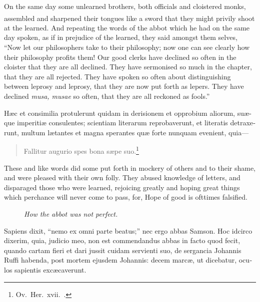 \documentclass[10pt]{book}
\newcounter{engnote}
\newcommand{\engnotenum}{\textsuperscript{\arabic{engnote}\stepcounter{engnote}}}
\newcommand{\blockhead}[4][]{
\begin{figure}
\centering
\vspace{#4}
\parbox{2.75cm}{\begin{center}\footnotesize \color{BrickRed} \emph{#2}\\ #1 \end{center}}
\end{figure}
}
\begin{document}
\begin{paracol}{2}
\switchcolumn

On the same day some unlearned brothers, both officials and cloistered monks, assembled and sharpened their tongues\engnotenum{} like a sword that they might privily shoot at the learned. And repeating the words of the abbot which he had on the same day spoken, as if in prejudice of the learned, they said amongst them selves, ``Now let our philosophers take to their philosophy; now one can see clearly how their philosophy profits them! Our good clerks have declined so often in the cloister that they are all declined. They have sermonised so much in the chapter, that they are all rejected. They have spoken so often about distinguishing between leprosy and leprosy, that they are now put forth as lepers. They have declined \emph{musa, musae} so often, that they are all reckoned as fools.''

\switchcolumn*

\begin{otherlanguage}{latin}
H\ae{}c et consimilia protulerunt quidam in derisionem et opprobium aliorum, su\ae{}que imperiti\ae{} consulentes; scientiam literarum reprobaverunt, et literatis detraxerunt, multum l\ae{}tantes et magna sperantes qu\ae{} forte nunquam evenient, quia---
\begin{verse}
Fallitur augurio spes bona s\ae{}pe suo.\footnote[\textdagger]{Ov.\ Her.\ xvii.\ .}
\end{verse}
\end{otherlanguage}

\switchcolumn

These and like words did some put forth in mockery of others and to their shame, and were pleased with their own folly. They abused knowledge of letters, and disparaged those who were learned, rejoicing greatly and hoping great things which perchance will never come to pass, for, Hope of good is ofttimes falsified.

\switchcolumn*

\begin{otherlanguage}{latin}
\blockhead{How the abbot was not perfect.}{3}{-.55cm}
Sapiens dixit, ``nemo ex omni parte beatus;'' nec ergo abbas Samson. Hoc idcirco dixerim, quia, judicio meo, non est commendandus abbas in facto quod fecit, quando cartam fieri et dari jussit cuidam servienti suo, de sergancia Johannis Ruffi habenda, post mortem ejusdem Johannis: decem marc\ae{}, ut dicebatur, oculos sapientis exc\ae{}caverunt. 

\end{otherlanguage}


\end{paracol}
\end{document}
